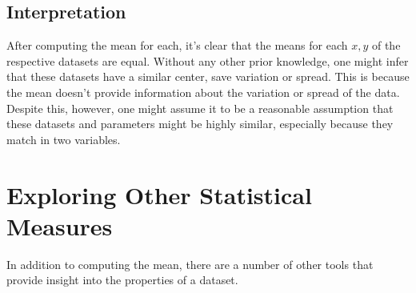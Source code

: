 \documentclass[11pt,a4paper]{article}
\begin{document}
\subsection{Interpretation}

After computing the mean for each, it's clear that the means for each $x, y$ of the respective datasets are equal. Without any other prior knowledge, one might infer that these datasets have a similar center, save variation or spread. This is because the mean doesn't provide information about the variation or spread of the data. Despite this, however, one might assume it to be a reasonable assumption that these datasets and parameters might be highly similar, especially because they match in two variables.

\section{Exploring Other Statistical Measures}

In addition to computing the mean, there are a number of other tools that provide insight into the properties of a dataset. 
\end{document}
